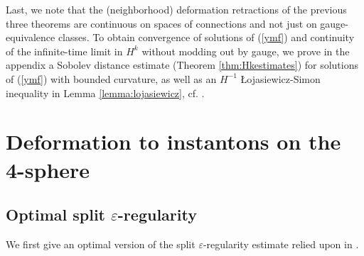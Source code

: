 \documentclass[12pt]{amsart}
\renewcommand{\1}{{\mathbf 1}}
\newcommand{\eps}{{\varepsilon}}
\theoremstyle{others}
\numberwithin{equation}{section}
\begin{document}
Last, we note that the (neighborhood) deformation retractions of the previous three theorems are continuous on spaces of connections and not just on gauge-equivalence classes. To obtain convergence of solutions of (\ref{ymf}) and continuity of the infinite-time limit in \(H^k\) without modding out by gauge, we prove in the appendix a Sobolev distance estimate (Theorem \ref{thm:Hkestimates}) for solutions of (\ref{ymf}) with bounded curvature, as well as an \(H^{-1}\) {\L}ojasiewicz-Simon inequality in Lemma \ref{lemma:lojasiewicz}, cf. \cite[(9.1)]{rade}.


\vspace{10mm}







\section{Deformation to instantons on the 4-sphere}





\subsection{Optimal split $\eps$-regularity} We first give an optimal version of the split $\eps$-regularity estimate relied upon in \cite{instantons}.
\end{document}

